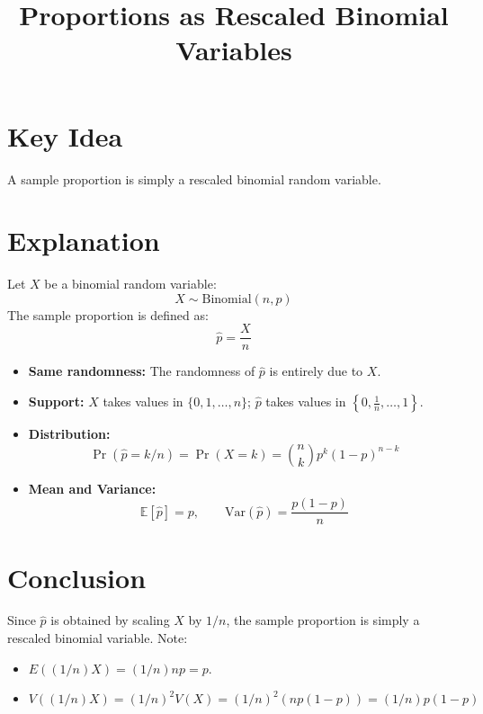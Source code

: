\documentclass{article}
\begin{document}
\title{Proportions as Rescaled Binomial Variables}
\author{}
\date{}
\maketitle

\section*{Key Idea}

A sample proportion is simply a rescaled binomial random variable.

\section*{Explanation}

Let $X$ be a binomial random variable:
\[
X \sim \text{Binomial}(n, p)
\]
The sample proportion is defined as:
\[
\hat{p} = \frac{X}{n}
\]

\begin{itemize}
    \item \textbf{Same randomness:} The randomness of $\hat{p}$ is entirely due to $X$.
    \item \textbf{Support:} $X$ takes values in $\{0, 1, \dots, n\}$; $\hat{p}$ takes values in $\left\{0, \frac{1}{n}, \dots, 1\right\}$.
    \item \textbf{Distribution:}
\[
    \Pr(\hat{p} = k/n) = \Pr(X = k) = \binom{n}{k} p^k (1-p)^{n-k}
\]
    \item \textbf{Mean and Variance:}
\[
    \mathbb{E}[\hat{p}] = p, \qquad \text{Var}(\hat{p}) = \frac{p(1-p)}{n}
\]
\end{itemize}

\section*{Conclusion}

Since $\hat{p}$ is obtained by scaling $X$ by $1/n$, the sample proportion is simply a rescaled binomial variable. Note:
\begin{itemize}
    \item $E((1/n)X)=(1/n) np=p$.
    \item $V((1/n)X)=(1/n)^2 V(X) = (1/n)^2 (np(1-p))=(1/n)p(1-p)$
\end{itemize}
\end{document}
